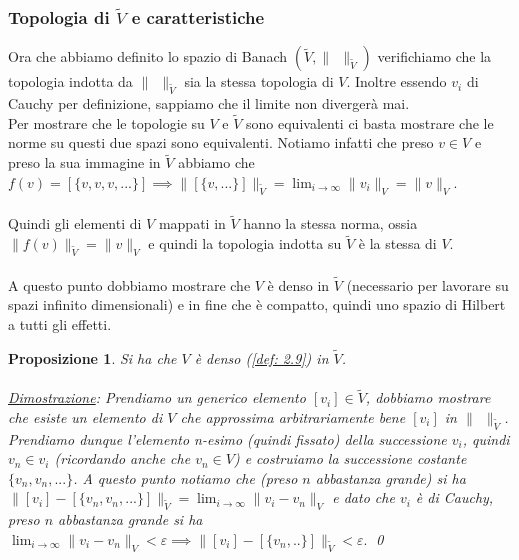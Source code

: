 \documentclass[a4paper,12pt]{report}
\newtheorem{proposizione}{Proposizione}[chapter]
\newcommand{\lt}{<}
\begin{document}
\subsubsection{Topologia di $\tilde{V}$ e caratteristiche}

Ora che abbiamo definito lo spazio di Banach $(\tilde{V}, \| \ \ \|_{\tilde{V}})$ verifichiamo che la topologia indotta da $\| \ \ \|_{\tilde{V}}$ sia la stessa topologia di $V$. Inoltre essendo $v_i$ di Cauchy per definizione, sappiamo che il limite non divergerà mai.
\\
Per mostrare che le topologie su $V$ e $\tilde{V}$ sono equivalenti ci basta mostrare che le norme su questi due spazi sono equivalenti.
Notiamo infatti che preso $v\in V$ e preso la sua immagine in $\tilde{V}$ abbiamo che $f(v)=[\{v,v,v,...\}] \implies \|[\{v,...\}]\|_{\tilde{V}}=\displaystyle\lim_{i \to \infty}\|v_i\|_V=\|v\|_V$.
\\
\\Quindi gli elementi di $V$ mappati in $\tilde{V}$ hanno la stessa norma, ossia $\|f(v)\|_{\tilde{V}}=\|v\|_V$ e quindi la topologia indotta su $\tilde{V}$ è la stessa di $V$.
\\
\\ A questo punto dobbiamo mostrare che $V$ è denso in $\tilde{V}$ (necessario per lavorare su spazi infinito dimensionali) e in fine che è compatto, quindi uno spazio di Hilbert a tutti gli effetti.

\newpage

\begin{proposizione}
    Si ha che $V$ è denso (\ref{def: 2.9}) in $\tilde{V}$.
    \\
    \\ \underline{Dimostrazione}: Prendiamo un generico elemento $[v_i] \in \tilde{V}$, dobbiamo mostrare che esiste un elemento di $V$ che approssima arbitrariamente bene $[v_i]$ in $\| \ \ \|_{\tilde{V}}$. Prendiamo dunque l'elemento n-esimo (quindi fissato) della successione $v_i$, quindi $v_n \in v_i$ (ricordando anche che $v_n \in V $) e costruiamo la successione costante $\{v_n,v_n,...\}$. A questo punto notiamo che (preso $n$ abbastanza grande) si ha $\| [v_i]-[\{v_n,v_n,...\}]\|_{\tilde{V}}=\displaystyle\lim_{i \to \infty}\|v_i-v_n\|_V$ e dato che $v_i$ è di Cauchy, preso $n$ abbastanza grande si ha $\displaystyle\lim_{i \to \infty}\|v_i-v_n\|_V \lt \varepsilon\implies \|[v_i]-[\{v_n,..\}]\|_{\tilde{V}}\lt\varepsilon.$ \qed
\end{proposizione}
\end{document}
